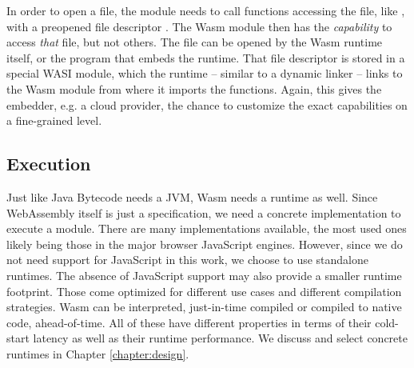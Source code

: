 In order to open a file, the module needs to call functions accessing the file, like , with a preopened file descriptor \cite{Clark2019}. The Wasm module then has the \emph{capability} to access \emph{that} file, but not others. The file can be opened by the Wasm runtime itself, or the program that embeds the runtime. That file descriptor is stored in a special WASI module, which the runtime -- similar to a dynamic linker -- links to the Wasm module from where it imports the functions. Again, this gives the embedder, e.g. a cloud provider, the chance to customize the exact capabilities on a fine-grained level.

\subsection{Execution}

Just like Java Bytecode needs a JVM, Wasm needs a runtime as well. Since WebAssembly itself is just a specification, we need a concrete implementation to execute a module. There are many implementations available, the most used ones likely being those in the major browser JavaScript engines. However, since we do not need support for JavaScript in this work, we choose to use standalone runtimes. The absence of JavaScript support may also provide a smaller runtime footprint. Those come optimized for different use cases and different compilation strategies. Wasm can be interpreted, just-in-time compiled or compiled to native code, ahead-of-time. All of these have different properties in terms of their cold-start latency as well as their runtime performance. We discuss and select concrete runtimes in Chapter \ref{chapter:design}.

